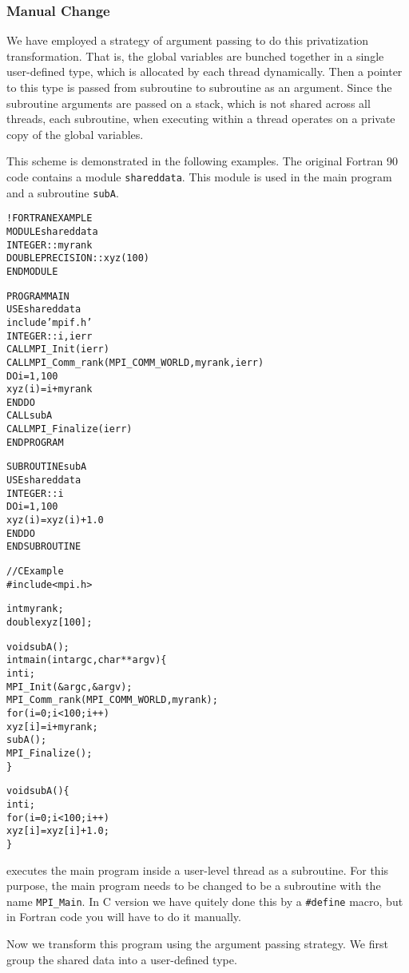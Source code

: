 \documentclass[10pt]{article}
\begin{document}
\subsubsection{Manual Change}
We have employed a strategy of argument passing to do this privatization
transformation. That is, the global variables are bunched together in a
single user-defined type, which is allocated by each thread dynamically. Then a
pointer to this type is passed from subroutine to subroutine as an argument.
Since the subroutine arguments are passed on a stack, which is not shared
across all threads, each subroutine, when executing within a thread operates on
a private copy of the global variables. 

This scheme is demonstrated in the following examples. The original Fortran 90 
code contains a module \texttt{shareddata}. This module is used in the main 
program and a subroutine \texttt{subA}.

\begin{alltt}
!FORTRAN EXAMPLE
MODULE shareddata
  INTEGER :: myrank
  DOUBLE PRECISION :: xyz(100)
END MODULE

PROGRAM MAIN
  USE shareddata
  include 'mpif.h'
  INTEGER :: i, ierr
  CALL MPI_Init(ierr)
  CALL MPI_Comm_rank(MPI_COMM_WORLD, myrank, ierr)
  DO i = 1, 100
    xyz(i) =  i + myrank
  END DO
  CALL subA
  CALL MPI_Finalize(ierr)
END PROGRAM

SUBROUTINE subA
  USE shareddata
  INTEGER :: i
  DO i = 1, 100
    xyz(i) = xyz(i) + 1.0
  END DO
END SUBROUTINE

//C Example
#include <mpi.h>

int myrank;
double xyz[100];

void subA();
int main(int argc, char** argv)\{
  int i;
  MPI_Init(&argc, &argv);
  MPI_Comm_rank(MPI_COMM_WORLD, myrank);
  for(i=0;i<100;i++)
    xyz[i] = i + myrank;
  subA();
  MPI_Finalize();
\}

void subA()\{
  int i;
  for(i=0;i<100;i++)
    xyz[i] = xyz[i] + 1.0;
\}
\end{alltt}

\ampi{} executes the main program inside a user-level thread as a subroutine.
For this purpose, the main program needs to be changed to be a subroutine with
the name \verb+MPI_Main+. In C version we have quitely done this by a {\tt \#define}
macro, but in Fortran code you will have to do it manually.
 
Now we transform this program using the argument passing strategy. We first group the
shared data into a user-defined type.
\end{document}
